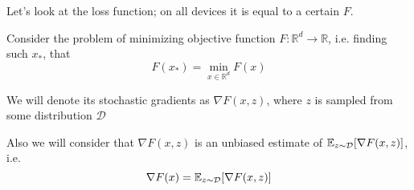 $ $\par

Let's look at the loss function; on all devices it is equal to a certain $F$.

Consider the problem of minimizing objective function \( F: \mathbb{R}^d \rightarrow \mathbb{R} \), i.e. finding such $x_*$, that
\[
F(x_*) = \min_{x \in \mathbb{R}^d} F(x)
\]


We will denote its stochastic gradients as $\nabla F(x, z)$, where $z$ is sampled from some distribution $\mathcal{D}$ 

Also we will consider that $\nabla F(x, z)$ is an unbiased estimate of $\mathbb{E}_{z \sim \mathcal{D}} [\nabla F(x, z)]$, i.e.
\[
\nabla F(x) = \mathbb{E}_{z \sim \mathcal{D}} [\nabla F(x, z)]
\]